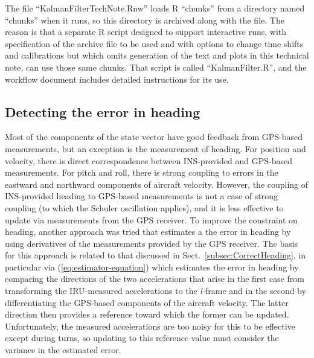 \documentclass[12pt,twoside,english,12pt,twoside,english]{article}\usepackage[]{graphicx}\usepackage[]{color}
\let\OrgIndex\index
\renewcommand*{\index}[1]{\OrgIndex{#1}}
\begin{document}
The file ``KalmanFilterTechNote.Rnw'' loads R ``chunks'' from
a directory named ``chunks'' when
it runs, so this directory is archived along with the file.
The reason is that a separate R script
designed to support interactive runs, with specification of the archive
file to be used and
with options to change time shifts and calibrations but which omits
generation of the text and plots in this technical note, can use those
same chunks. That script is called ``KalmanFilter.R'', and the workflow
document includes detailed instructions
for its use.


\subsection{Detecting the error in heading\label{subsec:heading-error}}

Most of
the components of the state vector have good
feedback from GPS-based measurements,
but an exception is the measurement of heading. For position and velocity,
there is direct correspondence between INS-provided and GPS-based
measurements. For pitch and roll, there is strong coupling
to errors in the eastward
and northward components of aircraft velocity.
However, the coupling of INS-provided heading
to GPS-based measurements is not a case of strong coupling (to which
the Schuler oscillation applies), and
it is less effective to update via measurements from the GPS receiver.
To improve the constraint on heading, another approach was tried that
estimates a the error in heading by using derivatives of the measurements
provided by the GPS receiver. The basis for this approach is related
to that discussed in Sect.~\ref{subsec:CorrectHeading}, in particular
via (\ref{eq:estimator-equation}) which estimates the error in heading
by comparing the directions of the two accelerations that arise in
the first case from transforming
the IRU-measured accelerations to
the \emph{l-}frame
and in the second by differentiating the GPS-based
components of the aircraft velocity. The latter direction then provides
a reference toward which the former
can be updated. Unfortunately, the measured accelerations
 are too noisy for this to be effective except during turns, so updating
to this reference value must consider the variance in the estimated
error. 
\end{document}
